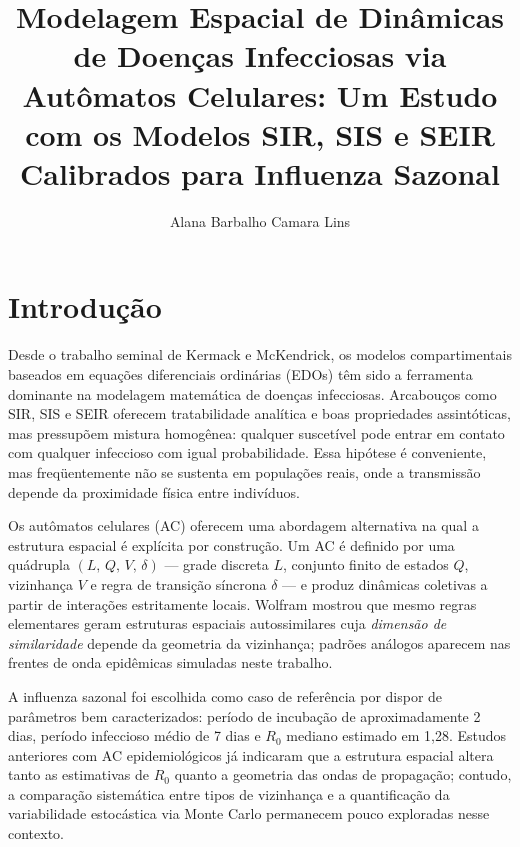\documentclass[fleqn,10pt]{wlscirep}
\title{Modelagem Espacial de Din\^{a}micas de Doen\c{c}as Infecciosas via Aut\^{o}matos Celulares: Um Estudo com os Modelos SIR, SIS e SEIR Calibrados para Influenza Sazonal}
\author[1,*]{Alana Barbalho Camara Lins}
\affil[1]{Universidade Federal Rural de Pernambuco (UFRPE), Departamento de Ci\^{e}ncia da Computa\c{c}\~{a}o, Recife, PE, Brasil}
\affil[*]{alana.lins@ufrpe.br}
\begin{document}
\flushbottom
\maketitle
\thispagestyle{empty}

\section*{Introdu\c{c}\~{a}o}

Desde o trabalho seminal de Kermack e McKendrick\cite{Kermack:1927}, os modelos compartimentais baseados em equa\c{c}\~{o}es diferenciais ordin\'{a}rias (EDOs) t\^{e}m sido a ferramenta dominante na modelagem matem\'{a}tica de doen\c{c}as infecciosas. Arcabou\c{c}os como SIR, SIS e SEIR oferecem tratabilidade anal\'{i}tica e boas propriedades assint\'{o}ticas, mas pressup\~{o}em mistura homog\^{e}nea: qualquer suscet\'{i}vel pode entrar em contato com qualquer infeccioso com igual probabilidade. Essa hip\'{o}tese \'{e} conveniente, mas freq\"{u}entemente n\~{a}o se sustenta em popula\c{c}\~{o}es reais, onde a transmiss\~{a}o depende da proximidade f\'{i}sica entre indiv\'{i}duos\cite{Keeling:2008}.

Os aut\^{o}matos celulares (AC) oferecem uma abordagem alternativa na qual a estrutura espacial \'{e} expl\'{i}cita por constru\c{c}\~{a}o. Um AC \'{e} definido por uma qu\'{a}drupla $(L,\,Q,\,V,\,\delta)$ --- grade discreta $L$, conjunto finito de estados $Q$, vizinhan\c{c}a $V$ e regra de transi\c{c}\~{a}o s\'{i}ncrona $\delta$ --- e produz din\^{a}micas coletivas a partir de intera\c{c}\~{o}es estritamente locais\cite{Wolfram:2002,Schiff:2007}. Wolfram\cite{Wolfram:2002} mostrou que mesmo regras elementares geram estruturas espaciais autossimilares cuja \emph{dimens\~{a}o de similaridade} depende da geometria da vizinhan\c{c}a; padr\~{o}es an\'{a}logos aparecem nas frentes de onda epidêmicas simuladas neste trabalho.

A influenza sazonal foi escolhida como caso de refer\^{e}ncia por dispor de par\^{a}metros bem caracterizados: per\'{i}odo de incuba\c{c}\~{a}o de aproximadamente 2 dias, per\'{i}odo infeccioso m\'{e}dio de 7 dias e $R_0$ mediano estimado em 1{,}28\cite{Biggerstaff:2014}. Estudos anteriores com AC epidemiol\'{o}gicos\cite{Sirakoulis:2000,Fuentes:1999} j\'{a} indicaram que a estrutura espacial altera tanto as estimativas de $R_0$ quanto a geometria das ondas de propaga\c{c}\~{a}o; contudo, a compara\c{c}\~{a}o sistem\'{a}tica entre tipos de vizinhan\c{c}a e a quantifica\c{c}\~{a}o da variabilidade estoc\'{a}stica via Monte Carlo permanecem pouco exploradas nesse contexto.
\end{document}
